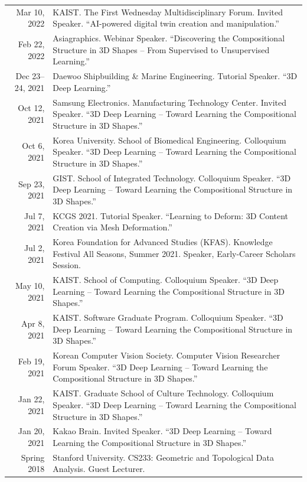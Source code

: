 \documentclass[letterpaper,10pt]{article} %
\begin{document}
\begin{xltabular}{\textwidth}{r|X}
Mar 10, 2022 & KAIST. The First Wednesday Multidisciplinary Forum. Invited Speaker. ``AI-powered digital twin creation and manipulation.''\\
Feb 22, 2022 & Asiagraphics. Webinar Speaker. ``Discovering the Compositional Structure in 3D Shapes -- From Supervised to Unsupervised Learning.''\\
Dec 23--24, 2021 & Daewoo Shipbuilding \& Marine Engineering. Tutorial Speaker. ``3D Deep Learning.''\\
Oct 12, 2021 & Samsung Electronics. Manufacturing Technology Center. Invited Speaker. ``3D Deep Learning -- Toward Learning the Compositional Structure in 3D Shapes.''\\
Oct 6, 2021 & Korea University. School of Biomedical Engineering. Colloquium Speaker. ``3D Deep Learning -- Toward Learning the Compositional Structure in 3D Shapes.''\\
Sep 23, 2021 & GIST. School of Integrated Technology. Colloquium Speaker. ``3D Deep Learning -- Toward Learning the Compositional Structure in 3D Shapes.''\\
Jul 7, 2021 & KCGS 2021. Tutorial Speaker. ``Learning to Deform: 3D Content Creation via Mesh Deformation.''\\
Jul 2, 2021 & Korea Foundation for Advanced Studies (KFAS). Knowledge Festival All Seasons, Summer 2021. Speaker, Early-Career Scholars Session.\\
May 10, 2021 & KAIST. School of Computing. Colloquium Speaker. ``3D Deep Learning -- Toward Learning the Compositional Structure in 3D Shapes.''\\
Apr 8, 2021 & KAIST. Software Graduate Program. Colloquium Speaker. ``3D Deep Learning -- Toward Learning the Compositional Structure in 3D Shapes.''\\
Feb 19, 2021 & Korean Computer Vision Society. Computer Vision Researcher Forum Speaker. ``3D Deep Learning -- Toward Learning the Compositional Structure in 3D Shapes.''\\
Jan 22, 2021 & KAIST. Graduate School of Culture Technology. Colloquium Speaker. ``3D Deep Learning -- Toward Learning the Compositional Structure in 3D Shapes.''\\
Jan 20, 2021 & Kakao Brain. Invited Speaker. ``3D Deep Learning -- Toward Learning the Compositional Structure in 3D Shapes.''\\
Spring 2018 & Stanford University. CS233: Geometric and Topological Data Analysis. Guest Lecturer.\\
\end{xltabular}
\end{document}
